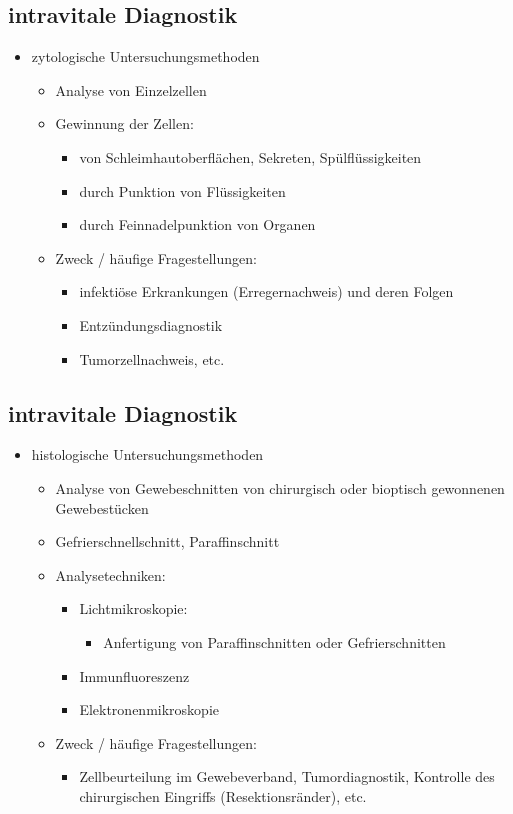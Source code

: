 \begin{it>emize}
\subsection{intravitale Diagnostik}
	\begin{itemize}
		\item zytologische Untersuchungsmethoden
			\begin{itemize}
				\item Analyse von Einzelzellen
				\item Gewinnung der Zellen:
					\begin{itemize}
						\item von Schleimhautoberflächen, Sekreten, Spülflüssigkeiten
						\item durch Punktion von Flüssigkeiten
						\item durch Feinnadelpunktion von Organen
					\end{itemize}
				\item Zweck / häufige Fragestellungen:
					\begin{itemize}
						\item infektiöse Erkrankungen (Erregernachweis) und deren Folgen
						\item Entzündungsdiagnostik
						\item Tumorzellnachweis, etc.
					\end{itemize}
			\end{itemize}
	\end{itemize}

\subsection{intravitale Diagnostik}
	\begin{itemize}
		\item histologische Untersuchungsmethoden
			\begin{itemize}
				\item Analyse von Gewebeschnitten von chirurgisch oder bioptisch gewonnenen Gewebestücken
				\item Gefrierschnellschnitt, Paraffinschnitt
				\item Analysetechniken:
					\begin{itemize}
						\item Lichtmikroskopie:
							\begin{itemize}
								\item Anfertigung von Paraffinschnitten oder Gefrierschnitten
							\end{itemize}
						\item Immunfluoreszenz
						\item Elektronenmikroskopie
					\end{itemize}
		\item Zweck / häufige Fragestellungen:
			\begin{itemize}
				\item Zellbeurteilung im Gewebeverband, Tumordiagnostik, Kontrolle des chirurgischen Eingriffs (Resektionsränder), etc.
			\end{itemize}
		\end{itemize}
	\end{itemize}


\end{it>emize}
